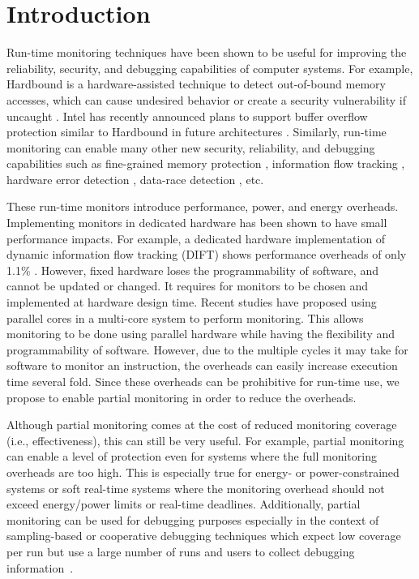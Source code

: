 \section{Introduction}
\label{sec:intro}

Run-time monitoring techniques have been shown to be useful for improving the
reliability, security, and debugging capabilities of computer systems. For
example, Hardbound is a hardware-assisted technique to detect out-of-bound
memory accesses, which can cause undesired behavior or create a security
vulnerability if uncaught \cite{hardbound-asplos08}.  Intel has
recently announced plans to support buffer overflow protection similar to
Hardbound in future architectures \cite{intel-mpx}. Similarly, run-time
monitoring can enable many other new security, reliability, and debugging
capabilities such as fine-grained memory protection \cite{mondrian-asplos02},
information flow tracking \cite{dift-asplos04, testudo-micro08}, hardware error
detection \cite{argus-micro07}, data-race detection \cite{radish-isca12,
cord-hpca06}, etc. 

These run-time monitors introduce performance, power, and energy overheads.
Implementing monitors in dedicated hardware has been shown to have small
performance impacts. For example, a dedicated hardware implementation of
dynamic information flow tracking (DIFT) shows performance
overheads of only 1.1\% \cite{dift-asplos04}. However, fixed hardware loses
the programmability of software, and cannot be updated or changed. It 
requires for monitors to be chosen and implemented at hardware design time.
Recent studies \cite{lba-isca08, ruwase-spaa08, paralog-asplos10, oases-sigops09} have proposed using parallel cores in a
multi-core system to perform monitoring. This allows monitoring to be done
using parallel hardware while having the flexibility and programmability of
software. However, due to the multiple cycles it may take for software to
monitor an instruction, the overheads can easily increase execution time
several fold.
Since these overheads can be prohibitive for run-time use, we propose to enable
partial monitoring in order to reduce the overheads.

Although partial monitoring comes at the cost of reduced monitoring coverage (i.e.,
effectiveness), this can still be very useful.
For example, partial
monitoring can enable a level of protection even for systems where the full
monitoring overheads are too high. This is especially true for energy- or
power-constrained systems or soft real-time systems where the monitoring
overhead should not exceed energy/power limits or real-time deadlines.
Additionally, partial monitoring can be used for debugging purposes
especially in the context of sampling-based or cooperative debugging techniques
which expect low coverage per run but use a large number of runs and users to
collect debugging information~\cite{liblit-pldi05, chilimbi-asplos04,
greathouse-cgo11}. 

